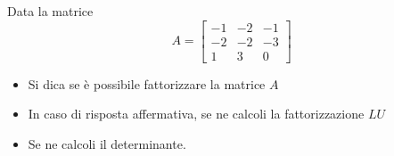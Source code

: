 Data la matrice
\bigskip
\[
A=\left[
\begin{array}{ccc}
-1 & -2 & -1 \\
-2 & -2 & -3\\
1 & 3 & 0
\end{array}\right]
\]

\begin{itemize}
\item Si dica se \`e possibile fattorizzare la matrice $A$
\item In caso di risposta affermativa, se ne calcoli la fattorizzazione $LU$
\item Se ne calcoli il determinante.
\end{itemize}
